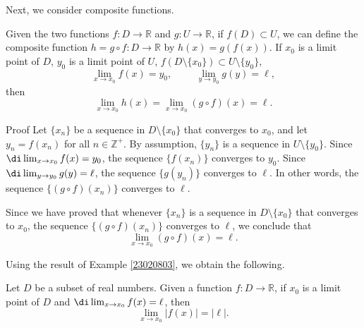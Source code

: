 Next, we consider composite functions. 
\begin{proposition}[label=23020815]{}
Given the two functions $f:D\rightarrow \mathbb{R}$ and $g: U\rightarrow\mathbb{R}$, if $f(D)\subset U$, we can define the composite function $h=g\circ f:D\rightarrow \mathbb{R}$ by
$h(x)=g(f(x))$. If $x_0$ is a limit point of $D$, $y_0$ is a limit point of $U$, $f(D\setminus\{x_0\})\subset U\setminus\{y_0\}$,
\[\lim_{x\rightarrow x_0}f(x)=y_0,\hspace{1cm}\lim_{y\rightarrow y_0}g(y)=\ell,\] then
\[\lim_{x\rightarrow x_0}h(x)=\lim_{x\rightarrow x_0}(g\circ f)(x)=\ell.\]
\end{proposition}
\begin{myproof}{Proof}
Let $\{x_n\}$ be a sequence in $D\setminus\{x_0\}$ that converges to $x_0$, and let $y_n=f(x_n)$ for all $n\in\mathbb{Z}^+$. By assumption,   $\{y_n\}$ is a sequence in $U\setminus\{y_0\}$.  Since $\di \lim_{x\rightarrow x_0}f(x)=y_0$, the sequence $\{f(x_n)\}$ converges to $y_0$. Since $\di\lim_{y\rightarrow y_0}g(y)=\ell$, the sequence
$\{g(y_n)\}$ converges to $\ell$. In other words, the sequence $\{(g\circ f)(x_n)\}$ converges to $\ell$.

Since we have proved that whenever  $\{x_n\}$ is a sequence in $D\setminus\{x_0\}$ that converges to $x_0$, the sequence $\{(g\circ f)(x_n)\}$ converges to $\ell$, we conclude that
\[\lim_{x\rightarrow x_0}(g\circ f)(x)=\ell.\]
\end{myproof}


Using the result of Example \ref{23020803}, we obtain the following.
\begin{corollary}{}
Let $D$ be a subset of real numbers. Given a function $f:D\rightarrow\mathbb{R}$, if $x_0$ is a limit point of $D$ and 
$\di \lim_{x\rightarrow x_0}f(x)=\ell$,
then
\[\lim_{x\rightarrow x_0}|f(x)|=|\ell|.\]
\end{corollary}

